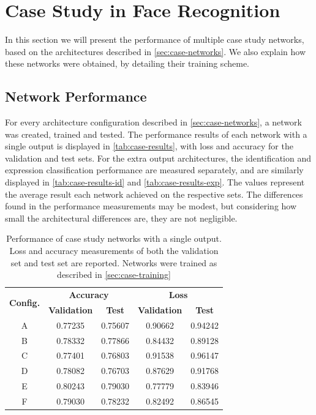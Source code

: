\section{Case Study in Face Recognition} \label{sec:case-results}

In this section we will present the performance of multiple case study networks, based on the architectures described in \autoref{sec:case-networks}. We also explain how these networks were obtained, by detailing their training scheme. 

\subsection{Network Performance}

For every architecture configuration described in \autoref{sec:case-networks}, a network was created, trained and tested. The performance results of each network with a single output is displayed in \autoref{tab:case-results}, with loss and accuracy for the validation and test sets. For the extra output architectures, the identification and expression classification performance are measured separately, and are similarly displayed in \autoref{tab:case-results-id} and \autoref{tab:case-results-exp}. The values represent the average result each network achieved on the respective sets. The differences found in the performance measurements may be modest, but considering how small the architectural differences are, they are not negligible.

\begin{table}[h!]
\begin{center}
\begin{tabular}{|c|c|c|c|c|}
\hline
\multirow{2}{*}{\textbf{Config.}} & \multicolumn{2}{|c|}{\textbf{Accuracy}} & \multicolumn{2}{|c|}{\textbf{Loss}} \\ \cline{2-5}
 & \textbf{Validation} & \textbf{Test} & \textbf{Validation} & \textbf{Test} \\ \hline
A & 0.77235 & 0.75607 & 0.90662 & 0.94242 \\ \hline
B & 0.78332 & 0.77866 & 0.84432 & 0.89128 \\ \hline
C & 0.77401 & 0.76803 & 0.91538 & 0.96147 \\ \hline
D & 0.78082 & 0.76703 & 0.87629 & 0.91768 \\ \hline
E & 0.80243 & 0.79030 & 0.77779 & 0.83946 \\ \hline
F & 0.79030 & 0.78232 & 0.82492 & 0.86545 \\ \hline
\end{tabular}
\end{center}
\caption[Performance of case study networks with a single output]{Performance of case study networks with a single output. Loss and accuracy measurements of both the validation set and test set are reported. Networks were trained as described in \autoref{sec:case-training}}
\label{tab:case-results}
\end{table}


